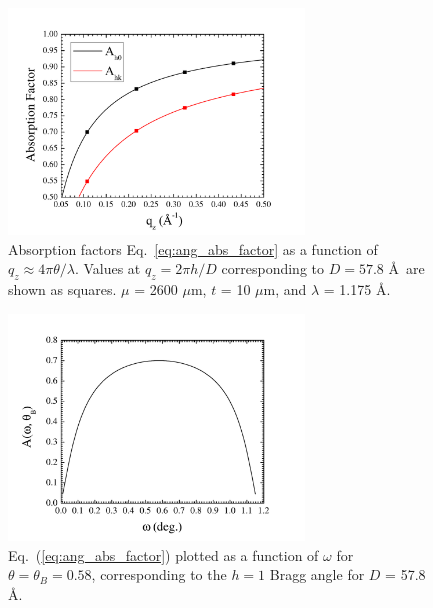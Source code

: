 \begin{figure}[htbp]
  \centering
  \includegraphics[width=0.7\textwidth]{figures/ripple/analysis/abs_factor}
  \caption{Absorption factors Eq.~\ref{eq:ang_abs_factor}
  as a function of $q_z \approx 4\pi\theta/\lambda$.
  Values at $q_z=2\pi h/D$ corresponding to $D=57.8$ \AA\ are shown as squares.
  $\mu$ = 2600 $\mu$m, $t$ = 10 $\mu$m, and $\lambda$ = 1.175 \AA.}
  \label{fig:abs_factor}
\end{figure}

\begin{figure}[htbp]
  \centering
  \includegraphics[width=0.7\textwidth]{figures/ripple/analysis/abs_integrand}
  \caption[Eq.~(\ref{eq:ang_abs_factor}) plotted as a function of $\omega$ for 
  $\theta=\theta_B$]{Eq.~(\ref{eq:ang_abs_factor}) plotted as a function of 
  $\omega$ for $\theta=\theta_B=0.58$\textdegree, corresponding to the $h=1$ 
  Bragg
  angle for $D$ = 57.8 \AA.}
  \label{fig:abs_integrand}
\end{figure}

